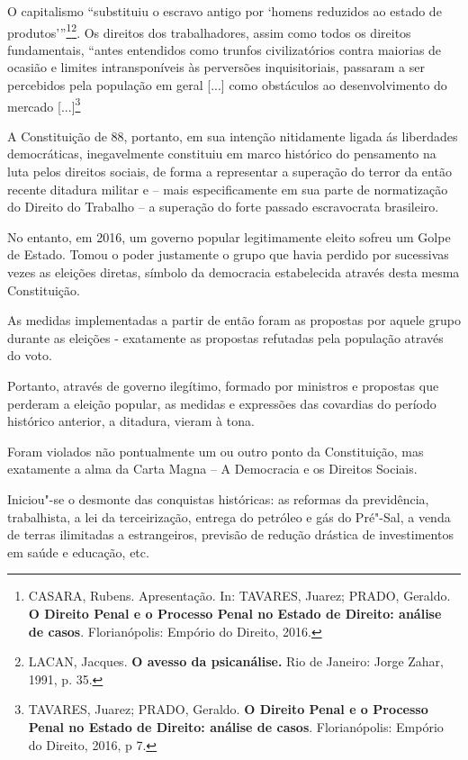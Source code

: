 O capitalismo ``substituiu o escravo antigo por `homens reduzidos ao
estado de produtos'''\footnote{CASARA, Rubens. Apresentação. In:
  TAVARES, Juarez; PRADO, Geraldo. \textbf{O Direito Penal e o Processo
  Penal no Estado de Direito: análise de casos}. Florianópolis: Empório
  do Direito, 2016.}\footnote{LACAN, Jacques. \textbf{O avesso da
  psicanálise.} Rio de Janeiro: Jorge Zahar, 1991, p. 35.}. Os direitos
dos trabalhadores, assim como todos os direitos fundamentais, ``antes
entendidos como trunfos civilizatórios contra maiorias de ocasião e
limites intransponíveis às perversões inquisitoriais, passaram a ser
percebidos pela população em geral {[}...{]} como obstáculos ao
desenvolvimento do mercado {[}...{]}\footnote{TAVARES, Juarez; PRADO,
  Geraldo. \textbf{O Direito Penal e o Processo Penal no Estado de
  Direito: análise de casos}. Florianópolis: Empório do Direito, 2016, p
  7.}

A Constituição de 88, portanto, em sua intenção nitidamente ligada ás
liberdades democráticas, inegavelmente constituiu em marco histórico do
pensamento na luta pelos direitos sociais, de forma a representar a
superação do terror da então recente ditadura militar e -- mais
especificamente em sua parte de normatização do Direito do Trabalho -- a
superação do forte passado escravocrata brasileiro.

No entanto, em 2016, um governo popular legitimamente eleito sofreu um
Golpe de Estado. Tomou o poder justamente o grupo que havia perdido por
sucessivas vezes as eleições diretas, símbolo da democracia estabelecida
através desta mesma Constituição.

As medidas implementadas a partir de então foram as propostas por aquele
grupo durante as eleições - exatamente as propostas refutadas pela
população através do voto.

Portanto, através de governo ilegítimo, formado por ministros e
propostas que perderam a eleição popular, as medidas e expressões das
covardias do período histórico anterior, a ditadura, vieram à tona.

Foram violados não pontualmente um ou outro ponto da Constituição, mas
exatamente a alma da Carta Magna -- A Democracia e os Direitos Sociais.

Iniciou"-se o desmonte das conquistas históricas: as reformas da
previdência, trabalhista, a lei da terceirização, entrega do petróleo e
gás do Pré"-Sal, a venda de terras ilimitadas a estrangeiros, previsão de
redução drástica de investimentos em saúde e educação, etc.

